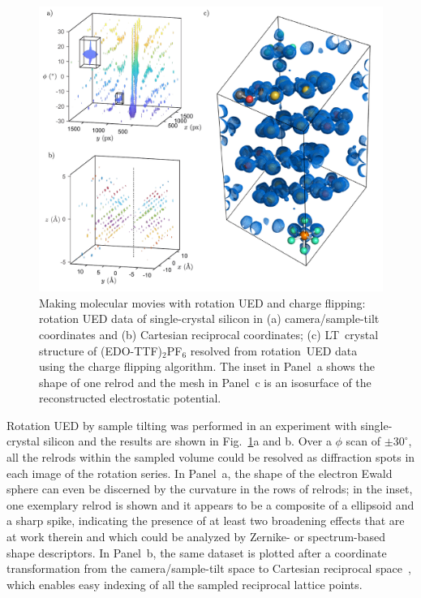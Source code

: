 
\begin{figure}[t!]
  \centering
  \includegraphics[width = \textwidth]{Figures/fig_RotationUED.pdf}
  \caption[Making molecular movies with rotation UED and charge flipping.]{
    Making molecular movies with rotation UED and charge flipping:
    rotation UED data of single-crystal silicon in
    (a) camera/sample-tilt coordinates and (b) Cartesian reciprocal coordinates;
    (c) LT~crystal structure of (EDO-TTF)$_2$PF$_6$
    resolved from rotation~UED data using the charge flipping algorithm.
    The inset in Panel~a shows the shape of one relrod
    and the mesh in Panel~c is an isosurface of the reconstructed electrostatic potential.
  }
  \label{fig: Rotation-data}
\end{figure}


Rotation UED by sample tilting was performed in an experiment with single-crystal silicon
and the results are shown in Fig.~\ref{fig: Rotation-data}a and b.
%
Over a $\phi$ scan of $\pm 30^\circ$, all the relrods within the sampled volume could be resolved
as diffraction spots in each image of the rotation series.
In Panel~a, the shape of the electron Ewald sphere can even be discerned by the curvature
in the rows of relrods; in the inset, one exemplary relrod is shown and
it appears to be a composite of a ellipsoid and a sharp spike,
indicating the presence of at least two broadening effects that are at work therein
and which could be analyzed by Zernike- or spectrum-based shape descriptors.
%
In Panel~b, the same dataset is plotted after a coordinate transformation
from the camera/sample-tilt space to Cartesian reciprocal space~\cite{Shaw1981},
which enables easy indexing of all the sampled reciprocal lattice points.

